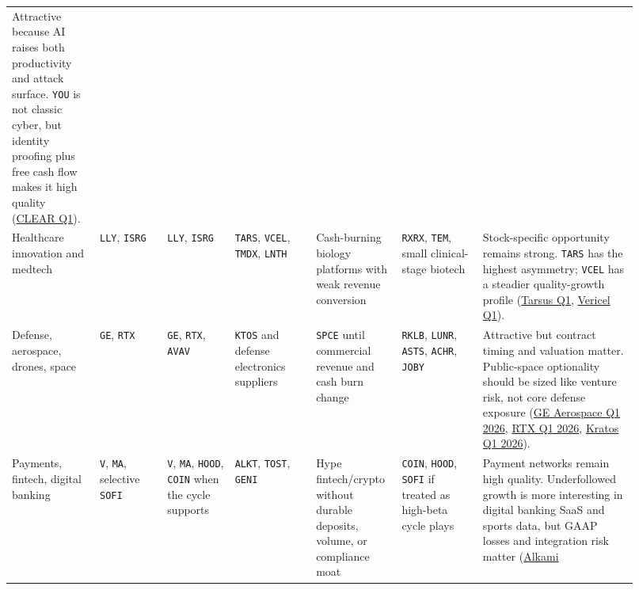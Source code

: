\documentclass[
  9pt,
]{article}
\begin{document}
\begin{longtable}[]{@{}L{0.13\linewidth}L{0.10\linewidth}L{0.10\linewidth}L{0.12\linewidth}L{0.12\linewidth}L{0.12\linewidth}L{0.23\linewidth}@{}}
Attractive because AI raises both productivity and attack surface.
\texttt{YOU} is not classic cyber, but identity proofing plus free cash
flow makes it high quality
(\href{https://ir.clearme.com/news-events/press-releases/detail/184/clear-announces-first-quarter-2026-financial-results}{CLEAR
Q1}). \\
Healthcare innovation and medtech & \texttt{LLY}, \texttt{ISRG} &
\texttt{LLY}, \texttt{ISRG} & \texttt{TARS}, \texttt{VCEL},
\texttt{TMDX}, \texttt{LNTH} & Cash-burning biology platforms with weak
revenue conversion & \texttt{RXRX}, \texttt{TEM}, small clinical-stage
biotech & Stock-specific opportunity remains strong. \texttt{TARS} has
the highest asymmetry; \texttt{VCEL} has a steadier quality-growth
profile
(\href{https://ir.tarsusrx.com/news-releases/news-release-details/tarsus-reports-first-quarter-2026-financial-results-and-recent/}{Tarsus
Q1},
\href{https://investors.vcel.com/news-releases/news-release-details/vericel-reports-first-quarter-2026-financial-results-and-raises}{Vericel
Q1}). \\
Defense, aerospace, drones, space & \texttt{GE}, \texttt{RTX} &
\texttt{GE}, \texttt{RTX}, \texttt{AVAV} & \texttt{KTOS} and defense
electronics suppliers & \texttt{SPCE} until commercial revenue and cash
burn change & \texttt{RKLB}, \texttt{LUNR}, \texttt{ASTS},
\texttt{ACHR}, \texttt{JOBY} & Attractive but contract timing and
valuation matter. Public-space optionality should be sized like venture
risk, not core defense exposure
(\href{https://www.geaerospace.com/news/investor-relations/ir-updates/ge-aerospace-releases-its-1q26-results}{GE
Aerospace Q1 2026},
\href{https://www.rtx.com/news/news-center/2026/04/21/rtx-reports-q1-2026-results-}{RTX
Q1 2026},
\href{https://www.kratosdefense.com/newsroom/kratos-reports-first-quarter-2026-financial-results-and-increases-fiscal-fy26-financial-guidance}{Kratos
Q1 2026}). \\
Payments, fintech, digital banking & \texttt{V}, \texttt{MA}, selective
\texttt{SOFI} & \texttt{V}, \texttt{MA}, \texttt{HOOD}, \texttt{COIN}
when the cycle supports & \texttt{ALKT}, \texttt{TOST}, \texttt{GENI} &
Hype fintech/crypto without durable deposits, volume, or compliance moat
& \texttt{COIN}, \texttt{HOOD}, \texttt{SOFI} if treated as high-beta
cycle plays & Payment networks remain high quality. Underfollowed growth
is more interesting in digital banking SaaS and sports data, but GAAP
losses and integration risk matter
(\href{https://investors.alkami.com/2026-04-29-Alkami-Announces-First-Quarter-2026-Financial-Results}{Alkami
}
\end{longtable}
\end{document}
